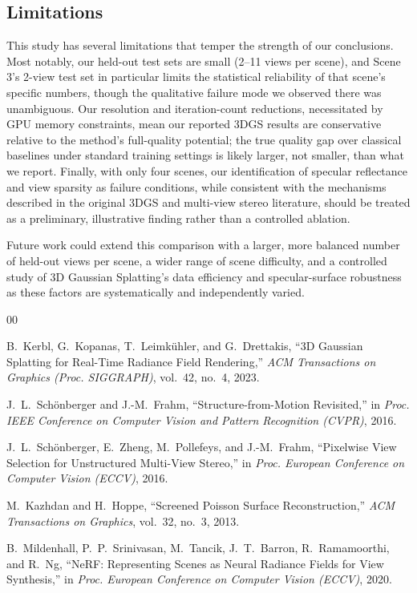 \documentclass[conference]{IEEEtran}
\begin{document}
\subsection{Limitations}
This study has several limitations that temper the strength of our conclusions. Most notably, our held-out test sets are small (2--11 views per scene), and Scene 3's 2-view test set in particular limits the statistical reliability of that scene's specific numbers, though the qualitative failure mode we observed there was unambiguous. Our resolution and iteration-count reductions, necessitated by GPU memory constraints, mean our reported 3DGS results are conservative relative to the method's full-quality potential; the true quality gap over classical baselines under standard training settings is likely larger, not smaller, than what we report. Finally, with only four scenes, our identification of specular reflectance and view sparsity as failure conditions, while consistent with the mechanisms described in the original 3DGS and multi-view stereo literature, should be treated as a preliminary, illustrative finding rather than a controlled ablation.

Future work could extend this comparison with a larger, more balanced number of held-out views per scene, a wider range of scene difficulty, and a controlled study of 3D Gaussian Splatting's data efficiency and specular-surface robustness as these factors are systematically and independently varied.

\begin{thebibliography}{00}

B.~Kerbl, G.~Kopanas, T.~Leimkühler, and G.~Drettakis, ``3D Gaussian Splatting for Real-Time Radiance Field Rendering,'' \textit{ACM Transactions on Graphics (Proc. SIGGRAPH)}, vol.~42, no.~4, 2023.

J.~L.~Schönberger and J.-M.~Frahm, ``Structure-from-Motion Revisited,'' in \textit{Proc. IEEE Conference on Computer Vision and Pattern Recognition (CVPR)}, 2016.

J.~L.~Schönberger, E.~Zheng, M.~Pollefeys, and J.-M.~Frahm, ``Pixelwise View Selection for Unstructured Multi-View Stereo,'' in \textit{Proc. European Conference on Computer Vision (ECCV)}, 2016.

M.~Kazhdan and H.~Hoppe, ``Screened Poisson Surface Reconstruction,'' \textit{ACM Transactions on Graphics}, vol.~32, no.~3, 2013.

B.~Mildenhall, P.~P.~Srinivasan, M.~Tancik, J.~T.~Barron, R.~Ramamoorthi, and R.~Ng, ``NeRF: Representing Scenes as Neural Radiance Fields for View Synthesis,'' in \textit{Proc. European Conference on Computer Vision (ECCV)}, 2020.

\end{thebibliography}
\end{document}
